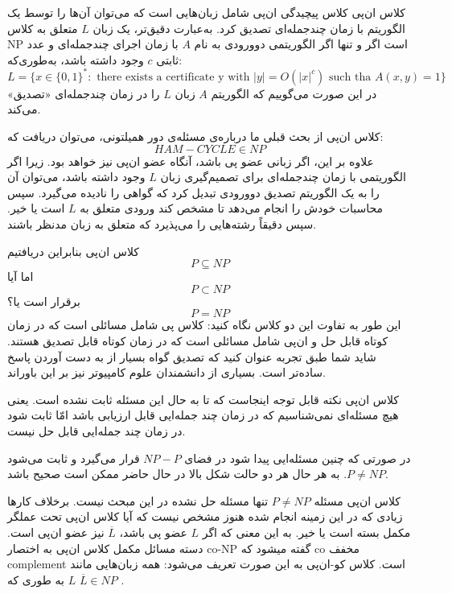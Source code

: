 \begin{itemframe}{کلاس ان‌پی}
\itm
کلاس پیچیدگی ان‌پی شامل زبان‌هایی است که می‌توان آن‌ها را توسط یک الگوریتم با زمان چندجمله‌ای تصدیق کرد.
به‌عبارت دقیق‌تر، یک زبان $L$ متعلق به کلاس NP است اگر و تنها اگر الگوریتمی دوورودی به نام $A$ با زمان اجرای چندجمله‌ای و عدد ثابتی $c$ وجود داشته باشد، به‌طوری‌که:
$$
L =
\{ x \in \{0,1\}^* :
\text{ there exists a certificate y with } |y| = O(|x|^c)
\text{ such tha } A(x, y) = 1
\}
$$
\itm
در این صورت می‌گوییم که الگوریتم $A$ زبان $L$ را در زمان چندجمله‌ای «تصدیق» می‌کند.
\end{itemframe}


\begin{itemframe}{کلاس ان‌پی}
\itm
از بحث قبلی ما درباره‌ی مسئله‌ی دور همیلتونی، می‌توان دریافت که:
$$
HAM-CYCLE \in NP
$$
علاوه بر این، اگر زبانی عضو پی باشد، آنگاه عضو ان‌پی نیز خواهد بود.
\itm
زیرا اگر الگوریتمی با زمان چندجمله‌ای برای تصمیم‌گیری زبان $L$ وجود داشته باشد، می‌توان آن را به یک الگوریتم تصدیق دوورودی تبدیل کرد که گواهی را نادیده می‌گیرد.
سپس محاسبات خودش را انجام می‌دهد تا مشخص کند ورودی متعلق به $L$ است یا خیر. سپس دقیقاً رشته‌هایی را می‌پذیرد که متعلق به زبان مدنظر باشند.
\end{itemframe}


\begin{itemframe}{کلاس ان‌پی}
\itm
بنابراین دریافتیم
$$
P \subseteq NP
$$
اما آیا
$$
P \subset NP
$$
برقرار است یا؟
$$
P = NP
$$
\itm
این طور به تفاوت این دو کلاس نگاه کنید:‌ کلاس پی شامل مسائلی است که در زمان کوتاه قابل حل و ان‌پی شامل مسائلی است که در زمان کوتاه قابل تصدیق هستند.
\itm
شاید شما طبق تجربه عنوان کنید که تصدیق گواه بسیار از به دست آوردن پاسخ ساده‌تر است. بسیاری از دانشمندان علوم کامپیوتر نیز بر این باوراند.
\end{itemframe}


\begin{itemframe}{کلاس ان‌پی}
\itm
نکته قابل توجه اینجاست که تا به حال این مسئله ثابت نشده است. یعنی هیچ مسئله‌ای نمی‌شناسیم که در زمان چند جمله‌ایی قابل ارزیابی باشد امّا ثابت شود در زمان چند جمله‌ایی قابل حل نیست.

\itm
در صورتی که چنین مسئله‌ایی پیدا شود در فضای
$NP - P$
قرار می‌گیرد و ثابت می‌شود
$P \neq NP$.
به هر حال هر دو حالت شکل بالا در حال حاضر ممکن است صحیح باشد.
\end{itemframe}


\begin{itemframe}{کلاس ان‌پی}
\itm
مسئله
$P \neq NP$
تنها مسئله حل نشده در این مبحث نیست. برخلاف کار‌ها زیادی که در این زمینه انجام شده هنوز مشخص نیست که آیا کلاس ان‌پی تحت عملگر مکمل بسته است یا خیر. به این معنی که اگر
$L$
عضو پی باشد،
$\overline{L}$
نیز عضو ان‌پی است.
\itm
دسته مسائل مکمل کلاس ان‌پی به اختصار co-NP گفته میشود که co مخفف complement است.
\itm
کلاس کو-ان‌پی به این صورت تعریف می‌شود: همه زبان‌هایی مانند $L$ به طوری که
$\overline{L} \in NP$ .
\end{itemframe}


